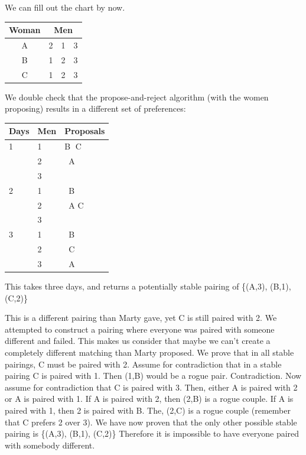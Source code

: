 \documentclass[11pt]{article}
\begin{document}
\begin{qunlist}
\begin{itemize}
We can fill out the chart by now.

\begin{center}
\begin{tabular}{|c|ccc|}\hline 
Woman&\multicolumn{3}{|c|}{Men}\\\hline 
A&2&1&3\\\hline 
B&1&2&3\\\hline 
C&1&2&3\\\hline
\end{tabular}
\end{center}

We double check that the propose-and-reject algorithm (with the women proposing) 
results in a different set of preferences:

\begin{center}
    \begin{tabular}{| l | l | l |}
    \hline
    Days & Men & Proposals \\ \hline
     1 & 1 & \textcircled{B} C \\ 
       & 2 & \ A \\ 
       & 3 &  \\ \hline
     2 & 1 & \ B \\ 
       & 2 &   \ A \textcircled{C} \\ 
       & 3 &  \\ \hline
     3 & 1 & \ B \\ 
       & 2 & \ C\\ 
       & 3 & \ A \\ \hline
    \end{tabular}
\end{center}
This takes three days, and returns a potentially stable pairing of \{(A,3), (B,1), (C,2)\}

This is a different pairing than Marty gave, yet C is still paired with 2. We attempted to construct a pairing where everyone was paired with someone different and failed. This makes us consider that maybe we can't create a completely different matching than Marty proposed. We prove that in all stable pairings, C must be paired with 2. 
Assume for contradiction that in a stable pairing C is paired with 1. 
Then (1,B) would be a rogue pair. Contradiction. 
Now assume for contradiction that C is paired with 3. Then, either A is paired with 2 or A is paired with 1. 
If A is paired with 2, then (2,B) is a rogue couple. If A is paired with 1, then 2 is paired with B. 
The, (2,C) is a rogue couple (remember that C prefers 2 over 3).
We have now proven that the only other possible stable pairing is \{(A,3), (B,1), (C,2)\} Therefore it is impossible to have everyone paired with somebody different.
\fi



\end{itemize}
\end{qunlist}
\end{document}
